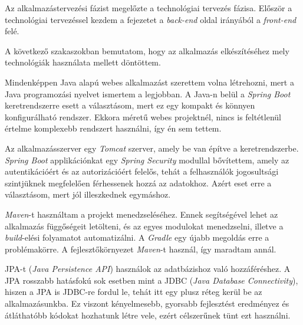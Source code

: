 



Az alkalmazástervezési fázist megelőzte a technológiai tervezés fázisa. Először a technológiai tervezéssel kezdem a fejezetet a \textit{back-end} oldal irányából a \textit{front-end} felé.


A következő szakaszokban bemutatom, hogy az alkalmazás elkészítéséhez mely technológiák használata mellett döntöttem.


Mindenképpen Java alapú webes alkalmazást szerettem volna létrehozni, mert a Java programozási nyelvet ismertem a legjobban. A Java-n belül a \textit{Spring Boot} keretrendszerre esett a választásom, mert ez egy kompakt és könnyen konfigurálható rendszer. Ekkora méretű webes projektnél, nincs is feltétlenül értelme komplexebb rendszert használni, így én sem tettem.

Az alkalmazásszerver egy \textit{Tomcat} szerver, amely be van építve a keretrendszerbe. \textit{Spring Boot} applikációnkat egy \textit{Spring Security} modullal bővítettem, amely az autentikációért és az autorizációért felelős, tehát a felhasználók jogosultsági szintjüknek megfelelően férhessenek hozzá az adatokhoz. Azért eset erre a választásom, mert jól illeszkednek egymáshoz.

\textit{Maven}-t használtam a projekt menedzseléséhez. Ennek segítségével lehet az alkalmazás függőségeit letölteni, és az egyes modulokat menedzselni, illetve a \textit{build}-elési folyamatot automatizálni. A \textit{Gradle} egy újabb megoldás erre a problémakörre. A fejlesztőkörnyezet \textit{Maven}-t használ, így maradtam annál.

JPA-t (\textit{Java Persistence API}) használok az adatbázishoz való hozzáféréshez. A JPA rosszabb hatásfokú sok esetben mint a JDBC (\textit{Java Database Connectivity}), hiszen a JPA is JDBC-re fordul le, tehát itt egy plusz réteg kerül be az alkalmazásunkba. Ez viszont kényelmesebb, gyorsabb fejlesztést eredményez és átláthatóbb kódokat hozhatunk létre vele, ezért célszerűnek tünt ezt használni.

